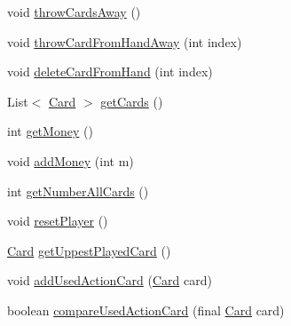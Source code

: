 \begin{DoxyCompactItemize}
void \hyperlink{interfacedominion_1_1model_1_1Player_a2ba21ea747daad8f0e3fea5faabbd64d}{throw\-Cards\-Away} ()
\item 
void \hyperlink{interfacedominion_1_1model_1_1Player_a6f89626c06020b31b22663899d7b5e78}{throw\-Card\-From\-Hand\-Away} (int index)
\item 
void \hyperlink{interfacedominion_1_1model_1_1Player_a5c260928aa98f03a4fbf16293cf2ed8c}{delete\-Card\-From\-Hand} (int index)
\item 
\-List$<$ \hyperlink{interfacedominion_1_1model_1_1cards_1_1Card}{\-Card} $>$ \hyperlink{interfacedominion_1_1model_1_1Player_a6a0a95096793642b9e27299d680871d1}{get\-Cards} ()
\item 
int \hyperlink{interfacedominion_1_1model_1_1Player_a5d7c60103c8cdc1d554c5ea2cbd8ca09}{get\-Money} ()
\item 
void \hyperlink{interfacedominion_1_1model_1_1Player_a9ebfab0b520b974c324aeea20a606209}{add\-Money} (int m)
\item 
int \hyperlink{interfacedominion_1_1model_1_1Player_a737217e1afed7e658efe8e5ba25d8844}{get\-Number\-All\-Cards} ()
\item 
void \hyperlink{interfacedominion_1_1model_1_1Player_a878ebb2459797afe157db2fa00426ac2}{reset\-Player} ()
\item 
\hyperlink{interfacedominion_1_1model_1_1cards_1_1Card}{\-Card} \hyperlink{interfacedominion_1_1model_1_1Player_a74c0ee666159253c148ccec1f2c803ac}{get\-Uppest\-Played\-Card} ()
\item 
void \hyperlink{interfacedominion_1_1model_1_1Player_a97dfd3f7e3d9ee103745a8ba34301536}{add\-Used\-Action\-Card} (\hyperlink{interfacedominion_1_1model_1_1cards_1_1Card}{\-Card} card)
\item 
boolean \hyperlink{interfacedominion_1_1model_1_1Player_a43b432d2b74cc59b306b9e555627ba8c}{compare\-Used\-Action\-Card} (final \hyperlink{interfacedominion_1_1model_1_1cards_1_1Card}{\-Card} card)
\end{DoxyCompactItemize}
